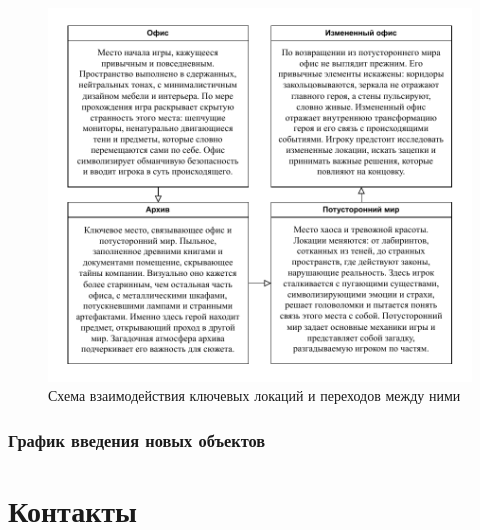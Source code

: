 \documentclass{article}
\begin{document}
	\begin{figure}[h!]
		\centering
		\includegraphics[width=\textwidth]{images/Локации.pdf} 
		\caption{Схема взаимодействия ключевых локаций и переходов между ними}
		\label{fig:pdf-example3}
	\end{figure}
	
	\subsubsection{График введения новых объектов}
	
	\newpage
	\section{Контакты}
	
\end{document}
